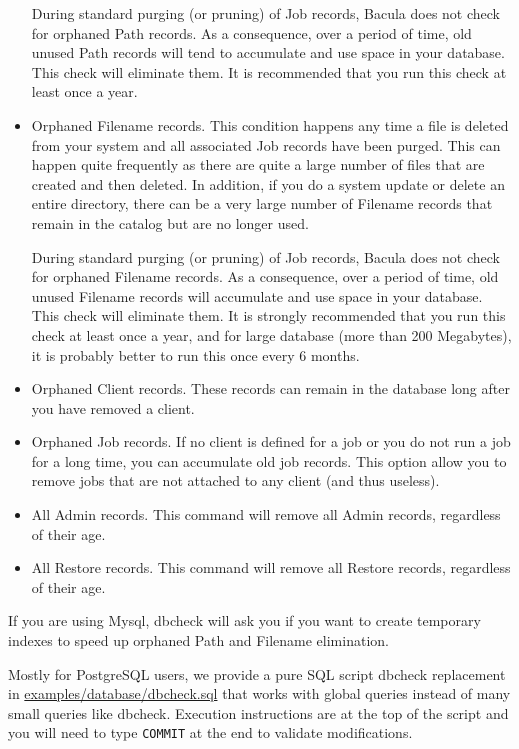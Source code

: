 \begin{itemize}
   During standard purging (or pruning) of Job records, Bacula does  not check
   for orphaned Path records. As a consequence, over a period  of time, old
   unused Path records will tend to accumulate and use  space in your database.
   This check will eliminate them. It is recommended that you run this
   check at least once a year. 
\item Orphaned Filename records. This condition happens any time a file is 
   deleted from your system and all associated Job records have been purged. 
   This can happen quite frequently as there are quite a large number  of files
   that are created and then deleted. In addition, if you  do a system update or
   delete an entire directory, there can be  a very large number of Filename
   records that remain in the catalog  but are no longer used.  

   During standard purging (or pruning) of Job records, Bacula does  not check
   for orphaned Filename records. As a consequence, over a period  of time, old
   unused Filename records will accumulate and use  space in your database. This
   check will eliminate them. It is strongly  recommended that you run this check
   at least once a year, and for  large database (more than 200 Megabytes), it is
   probably better to  run this once every 6 months.  
\item Orphaned Client records. These records can remain in the database  long
   after you have removed a client. 
\item Orphaned Job records. If no client is defined for a job or you  do not
   run a job for a long time, you can accumulate old job  records. This option
   allow you to remove jobs that are not  attached to any client (and thus
   useless).  
\item All Admin records. This command will remove all Admin records, 
   regardless of their age.  
\item All Restore records. This command will remove all Restore records, 
   regardless of their age. 
\end{itemize}


If you are using Mysql, dbcheck will ask you if you want to create temporary
indexes to speed up orphaned Path and Filename elimination.

Mostly for PostgreSQL users, we provide a pure SQL script dbcheck replacement
in \url{examples/database/dbcheck.sql} that works with global queries instead
of many small queries like dbcheck. Execution instructions are at the top of
the script and you will need to type \texttt{COMMIT} at the end to validate
modifications.

